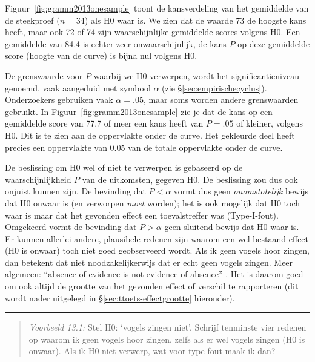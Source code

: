 \documentclass[
]{book}
\begin{document}
Figuur~\ref{fig:gramm2013onesample} toont de kansverdeling van het
gemiddelde van de steekproef (\(n=34\)) als H0 waar is. We zien dat de
waarde 73 de hoogste kans heeft, maar ook 72 of 74 zijn waarschijnlijke
gemiddelde scores volgens H0. Een gemiddelde van 84.4 is echter zeer
onwaarschijnlijk, de kans \(P\) op deze gemiddelde score (hoogte van de
curve) is bijna nul volgens H0.

De grenswaarde voor \(P\) waarbij we H0 verwerpen, wordt het
significantieniveau genoemd, vaak aangeduid met symbool \(\alpha\) (zie
§\ref{sec:empirischecyclus}). Onderzoekers gebruiken vaak \(\alpha=.05\),
maar soms worden andere grenswaarden gebruikt. In
Figuur~\ref{fig:gramm2013onesample} zie je dat de kans op een
gemiddelde score van 77.7 of meer een kans heeft van \(P=.05\) of kleiner,
volgens H0. Dit is te zien aan de oppervlakte onder de curve. Het
gekleurde deel heeft precies een oppervlakte van 0.05 van de totale
oppervlakte onder de curve.

De beslissing om H0 wel of niet te verwerpen is gebaseerd op de
waarschijnlijkheid \(P\) van de uitkomsten, gegeven H0. De beslissing zou
dus ook onjuist kunnen zijn. De bevinding dat \(P < \alpha\) vormt dus
geen \emph{onomstotelijk} bewijs dat H0 onwaar is (en verworpen \emph{moet}
worden); het is ook mogelijk dat H0 toch waar is maar dat het gevonden
effect een toevalstreffer was (Type-I-fout). Omgekeerd vormt de
bevinding dat \(P > \alpha\) geen sluitend bewijs dat H0 waar is. Er
kunnen allerlei andere, plausibele redenen zijn waarom een wel bestaand
effect (H0 is onwaar) toch niet goed geobserveerd wordt. Als ik geen
vogels hoor zingen, dan betekent dat niet noodzakelijkerwijs dat er echt
geen vogels zingen. Meer algemeen: ``absence of evidence is not evidence
of absence'' \citetext{\citealp[p.121]{Sagan96}; \citealp{Alde04}}. Het is daarom goed om ook altijd
de grootte van het gevonden effect of verschil te rapporteren (dit wordt
nader uitgelegd in §\ref{sec:ttoets-effectgrootte} hieronder).

\begin{center}\rule{0.5\linewidth}{0.5pt}\end{center}

\begin{quote}
\emph{Voorbeeld 13.1:} Stel H0: `vogels zingen niet'. Schrijf tenminste
vier redenen op waarom ik geen vogels hoor zingen, zelfs als er wel
vogels zingen (H0 is onwaar). Als ik H0 niet verwerp, wat voor type
fout maak ik dan?
\end{quote}
\end{document}
